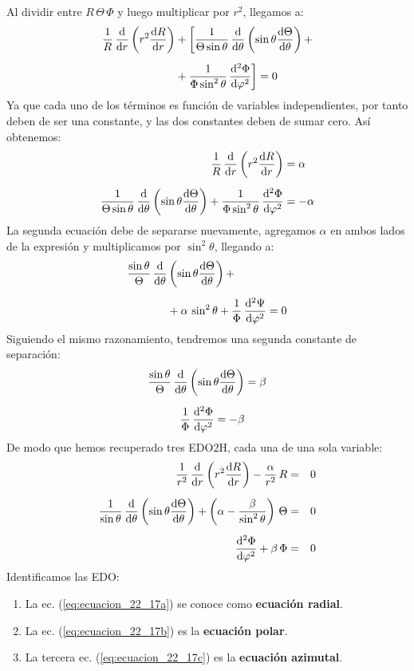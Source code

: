 \documentclass[12pt]{article}
\numberwithin{equation}{section}
\begin{document}
Al dividir entre $R \, \Theta \, \Phi$ y luego multiplicar por $r^{2}$, llegamos a:
\begin{align*}
\dfrac{1}{R} \, \dv{r} \left( r^{2} \dv{R}{r} \right) &+ \bigg[ \dfrac{1}{\Theta \sin \theta} \, \dv{\theta} \left( \sin \theta \dv{\Theta}{\theta} \right) + \\[0.5em]
&+ \dfrac{1}{\Phi \sin^{2} \theta} \, \dv[2]{\Phi}{\varphi} \bigg] = 0
\end{align*}
Ya que cada uno de los términos es función de variables independientes, por tanto deben de ser una constante, y las dos constantes deben de sumar cero. Así obtenemos:
\begin{align*}
\dfrac{1}{R} \, \dv{r} \left( r^{2} \dv{R}{r} \right) &= \alpha \\[0.5em]
\dfrac{1}{\Theta \sin \theta} \, \dv{\theta} \left( \sin \theta \dv{\Theta}{\theta} \right) + \dfrac{1}{\Phi \sin^{2} \theta} \, \dv[2]{\Phi}{\varphi} &= - \alpha
\end{align*}
La segunda ecuación debe de separarse nuevamente, agregamos $\alpha$ en ambos lados de la expresión y multiplicamos por $\sin^{2} \theta$, llegando a:
\begin{align*}
\dfrac{\sin \theta}{\Theta} \, \dv{\theta} &\left( \sin \theta \dv{\Theta}{\theta} \right) + \\[0.5em]
&+\alpha \, \sin^{2} \theta +  \dfrac{1}{\Phi} \, \dv[2]{\Psi}{\varphi} = 0
\end{align*}
Siguiendo el mismo razonamiento, tendremos una segunda constante de separación:
\begin{align*}
\dfrac{\sin \theta}{\Theta} \, \dv{\theta} \left( \sin \theta \dv{\Theta}{\theta} \right) &= \beta \\[0.5em]
\dfrac{1}{\Phi} \, \dv[2]{\Phi}{\varphi} = - \beta
\end{align*}
De modo que hemos recuperado tres EDO2H, cada una de una sola variable:
\begin{eqnarray}
\dfrac{1}{r^{2}} \, \dv{r} \left( r^{2} \dv{R}{r} \right) - \dfrac{\alpha}{r^{2}} \, R &=& 0 \label{eq:ecuacion_22_17a} \\[0.5em] 
\dfrac{1}{\sin \theta} \, \dv{\theta} \left( \sin \theta \dv{\Theta}{\theta} \right) + \left( \alpha - \dfrac{\beta}{\sin^{2} \theta} \right) \, \Theta &=& 0 \label{eq:ecuacion_22_17b} \\[0.5em] 
\dv[2]{\Phi}{\varphi} + \beta \, \Phi &=& 0 \label{eq:ecuacion_22_17c}
\end{eqnarray}
Identificamos las EDO:
\begin{enumerate}
\item La ec. (\ref{eq:ecuacion_22_17a}) se conoce como \textbf{ecuación radial}.
\item La ec. (\ref{eq:ecuacion_22_17b}) es la \textbf{ecuación polar}.
\item La tercera ec. (\ref{eq:ecuacion_22_17c}) es la \textbf{ecuación azimutal}.
\end{enumerate}
\end{document}
